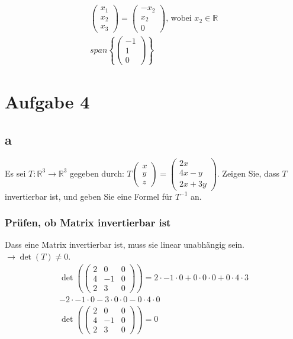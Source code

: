 \begin{align*}
\begin{pmatrix}
    x_1 \\ x_2 \\ x_3
\end{pmatrix} = \begin{pmatrix}
    -x_2 \\ x_2 \\ 0
\end{pmatrix} \text{, wobei } x_2 \in \mathbb{R} \\
span\left\{\begin{pmatrix}
    -1 \\ 1 \\ 0
\end{pmatrix}\right\}
\end{align*}

\section{Aufgabe 4}

\subsection{a}
Es sei $T: \mathbb{R}^3 \rightarrow \mathbb{R}^3$ gegeben durch: $T \begin{pmatrix} x \\ y \\ z \end{pmatrix} = \begin{pmatrix}2x \\ 4x-y \\ 2x+3y\end{pmatrix}$. Zeigen Sie, dass $T$ invertierbar ist, und geben Sie eine Formel für $T^{-1}$ an.

\subsubsection*{Prüfen, ob Matrix invertierbar ist}
Dass eine Matrix invertierbar ist, muss sie linear unabhängig sein. $\rightarrow \det(T) \neq 0$.
\begin{align*}
    \det\left(\begin{pmatrix}
        2 & 0 & 0 \\
        4 & -1 & 0 \\
        2 & 3 & 0
    \end{pmatrix}\right) = 2 \cdot -1 \cdot 0 + 0 \cdot 0 \cdot 0 + 0 \cdot 4 \cdot 3 \\
    - 2 \cdot -1 \cdot 0 - 3 \cdot 0 \cdot 0 - 0 \cdot 4 \cdot 0 \\
    \det\left(\begin{pmatrix}
        2 & 0 & 0 \\
        4 & -1 & 0 \\
        2 & 3 & 0
    \end{pmatrix}\right) = 0
\end{align*}

